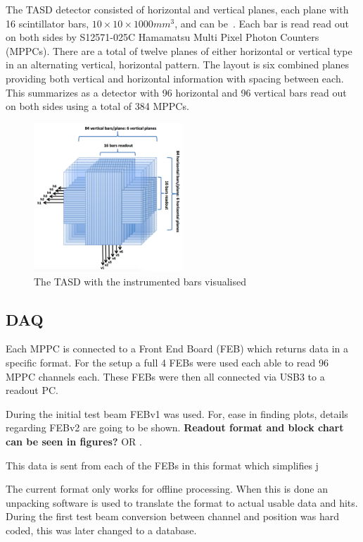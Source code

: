 The TASD detector consisted of horizontal and vertical planes, each plane with 16 scintillator bars, $10\times10\times1000 mm^3$, and can be~. Each bar is read read out on both sides by S12571-025C Hamamatsu Multi Pixel Photon Counters (MPPCs). There are a total of twelve planes of either horizontal or vertical type in an alternating vertical, horizontal pattern. The layout is six combined planes providing both vertical and horizontal information with spacing between each. This summarizes as a detector with 96 horizontal and 96 vertical bars read out on both sides using a total of 384 MPPCs. 

\begin{figure}[h!]
\centering
\includegraphics[width=0.5\textwidth]{figures/AIDA.png}
\caption{The TASD with the instrumented bars visualised}
\label{fig:TASD}
\end{figure}

\subsection{DAQ}
Each MPPC is connected to a Front End Board (FEB) which returns data in a specific format. For the setup a full 4 FEBs were used each able to read 96 MPPC channels each. These FEBs were then all connected via USB3 to a readout PC. 

During the initial test beam FEBv1 was used. For, ease in finding plots, details regarding FEBv2 are going to be shown.
\textbf{Readout format and block chart can be seen in figures? }OR \cite{71Status17}.

This data is sent from each of the FEBs in this format which simplifies j


The current format only works for offline processing. When this is done an unpacking software is used to translate the format to actual usable data and hits. 
During the first test beam conversion between channel and position was hard coded, this was later changed to a database.  

